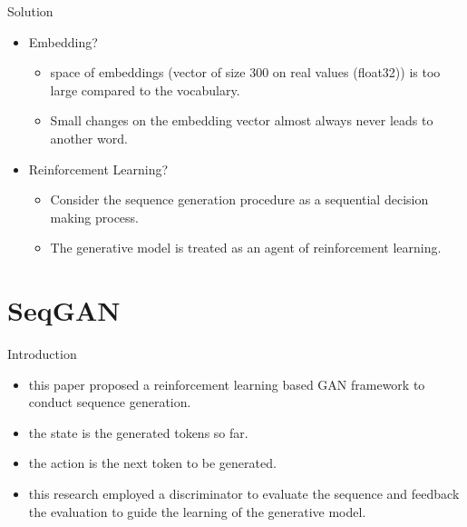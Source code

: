 \documentclass[10pt]{beamer}
\newcommand{\subtitlepage}[3]{\title{#1}\subtitle{#2}\author{#3}\date{}\begin{frame}[plain]\titlepage\end{frame}}
\begin{document}
	\begin{frame}{Solution}
		\begin{itemize}
			\item Embedding? 
			\begin{itemize}
				\item space of embeddings (vector of size 300 on real values (float32)) is too large compared to the vocabulary. 
				\item Small changes on the embedding vector almost always never leads to another word.
			\end{itemize}
			\item Reinforcement Learning? 
			\begin{itemize}
				\item Consider the sequence generation procedure as a sequential decision making process.
				\item The generative model is treated as an agent of reinforcement learning.
			\end{itemize}
		\end{itemize}
	\end{frame}
	
	\part{SeqGAN}
	\subtitlepage{}{SeqGAN: Sequence Generative Adversarial Nets with Policy Gradient}{Lantao Yu, Weinan Zhang, Jun Wang, Yong Yu\\NIPS 2016\\arXiv: 1609.05473}
	\begin{frame}{Introduction}
		\begin{itemize}
			\item this paper proposed a reinforcement learning based GAN framework to conduct sequence generation.
			\item the state is the generated tokens so far.
			\item the action is the next token to be generated.
			\item this research employed a discriminator to evaluate the sequence and feedback the evaluation to guide the learning of the generative model.
		\end{itemize}
	\end{frame}
\end{document}
